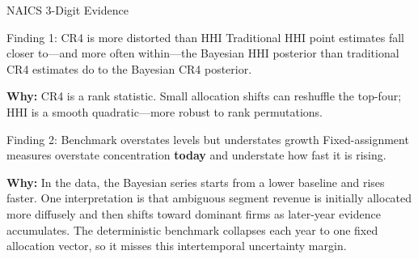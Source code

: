 \documentclass[aspectratio=169]{beamer}
\begin{document}
\begin{frame}{NAICS 3-Digit Evidence}


  \vspace{1em}

  \begin{block}{Finding 1: CR4 is more distorted than HHI}
    Traditional HHI point estimates fall closer to---and more often within---the Bayesian HHI posterior than traditional CR4 estimates do to the Bayesian CR4 posterior.

    \medskip
    \textbf{Why:} CR4 is a rank statistic. Small allocation shifts can reshuffle the top-four; HHI is a smooth quadratic---more robust to rank permutations.
  \end{block}

  \vspace{0.8em}

  \begin{alertblock}{Finding 2: Benchmark overstates levels but understates growth}
    Fixed-assignment measures overstate concentration \textbf{today} and understate how fast it is rising.

    \medskip
    \textbf{Why:} In the data, the Bayesian series starts from a lower baseline and rises faster. One interpretation is that ambiguous segment revenue is initially allocated more diffusely and then shifts toward dominant firms as later-year evidence accumulates. The deterministic benchmark collapses each year to one fixed allocation vector, so it misses this intertemporal uncertainty margin.
  \end{alertblock}

\end{frame}

\end{document}
